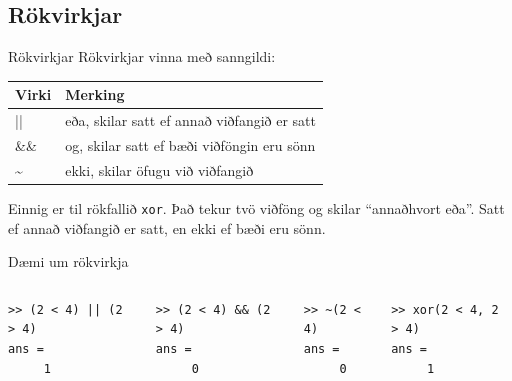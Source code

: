 \documentclass[handout]{beamer}
\begin{document}
\subsection{Rökvirkjar}
\begin{frame}{Rökvirkjar}
Rökvirkjar vinna með sanngildi:
\begin{center}
\begin{tabular}{ll}
\toprule
Virki&Merking\\
\midrule
||& eða\footnotemark, skilar satt ef annað viðfangið er satt\\
\&\& & og\footnotemark[1], skilar satt ef bæði viðföngin eru sönn\\
\~{} &ekki, skilar öfugu við viðfangið\\
\bottomrule
\end{tabular}
\end{center}
Einnig er til rökfallið \texttt{xor}. Það tekur tvö viðföng og skilar ``annaðhvort eða''. Satt ef annað viðfangið er satt, en ekki ef bæði eru sönn.
\end{frame}

\begin{frame}[fragile]{Dæmi um rökvirkja}
\begin{columns}
\begin{verbatim}
>> (2 < 4) || (2 > 4)
ans =
     1
\end{verbatim}
\begin{verbatim}
>> (2 < 4) && (2 > 4)
ans =
     0
\end{verbatim}
\begin{verbatim}
>> ~(2 < 4)
ans =
     0
\end{verbatim}
\begin{verbatim}
>> xor(2 < 4, 2 > 4)
ans =
     1
\end{verbatim}
\end{columns}
\end{frame}
\end{document}

